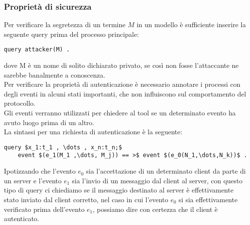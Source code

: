 \subsubsection*{Proprietà di sicurezza}
Per verificare la segretezza di un termine $M$ in un modello è sufficiente inserire la seguente query prima del processo principale:
\begin{lstlisting}[language=app]
    query attacker(M) .
\end{lstlisting} 
dove M è un nome di solito dichiarato privato, se così non fosse l'attaccante ne sarebbe banalmente a conoscenza.\\
Per verificare la proprietà di autenticazione è necessario annotare i processi con degli eventi in alcuni stati importanti, che non influiscono sul comportamento del protocollo.\\
Gli eventi verranno utilizzati per chiedere al tool se un determinato evento ha avuto luogo prima di un altro.\\
La sintassi per una richiesta di autenticazione è la seguente:
\begin{lstlisting}[language=app, mathescape]
    query $x_1:t_1 , \dots , x_n:t_n;$ 
    event $(e_1(M_1 ,\dots, M_j)) == >$ event $(e_0(N_1,\dots,N_k))$ .
\end{lstlisting} 
Ipotizzando che l'evento $e_0$ sia l'accettazione di un determinato client da parte di un server e l'evento $e_1$ sia l'invio di un messaggio dal client al server, con questo tipo di query ci chiediamo se il messaggio destinato al server è effettivamente stato inviato dal client corretto, nel caso in cui l'evento $e_0$ si sia effettivamente verificato prima dell'evento $e_1$, possiamo dire con certezza che il client è autenticato.\\

